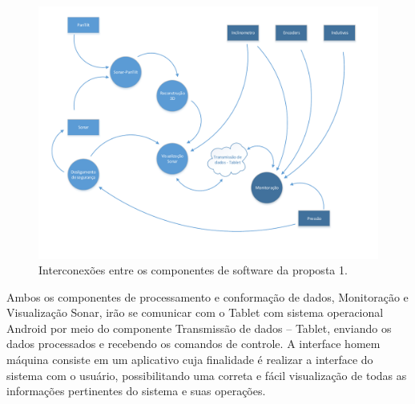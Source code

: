 \begin{figure}[H] 
\centering
\includegraphics[width=\textwidth,height=\textheight,keepaspectratio]{figs/software/EstrutSoft/prop1_soft_2.pdf}
\caption{Interconexões entre os componentes de software da proposta 1.}
\label{fig:ES:1}
\end{figure}

Ambos os componentes de processamento e conformação de dados, Monitoração e
Visualização Sonar, irão se comunicar com o Tablet com sistema operacional
Android por meio do componente Transmissão de dados – Tablet, enviando os dados
processados e recebendo os comandos de controle.  A interface homem máquina
consiste em um aplicativo cuja finalidade é realizar a interface do sistema com
o usuário, possibilitando uma correta e fácil visualização de todas as
informações pertinentes do sistema e suas operações.

